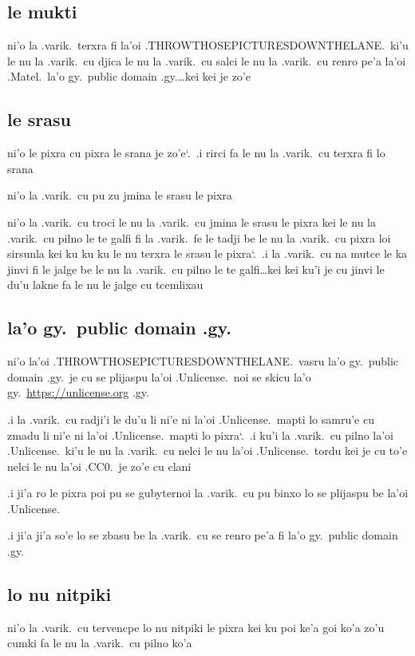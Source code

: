 \documentclass{report}
\newcommand\sds{\spacefactor\sfcode`.\ \space}
\begin{document}
\subsection{le mukti}
ni'o la .varik.\ terxra fi la'oi .THROWTHOSEPICTURESDOWNTHELANE.\ ki'u le nu la .varik.\ cu djica le nu la .varik.\ cu salci le nu la .varik.\ cu renro pe'a la'oi .Matel.\ la'o gy.\ public domain .gy.\ldots kei kei je zo'e

\subsection{le srasu}
ni'o le pixra cu pixra le srana je zo'e\sds  .i rirci fa le nu la .varik.\ cu terxra fi lo srana

ni'o la .varik.\ cu pu zu jmina le srasu le pixra

ni'o la .varik.\ cu troci le nu la .varik.\ cu jmina le srasu le pixra kei le nu la .varik.\ cu pilno le te galfi fi la .varik.\ fe le tadji be le nu la .varik.\ cu pixra loi sirsunla kei ku ku ku le nu terxra le srasu le pixra\sds  .i la .varik.\ cu na mutce le ka jinvi fi le jalge be le nu la .varik.\ cu pilno le te galfi\ldots kei kei ku'i je cu jinvi le du'u lakne fa le nu le jalge cu tcemlixau

\subsection{la'o gy.\ public domain .gy.}
ni'o la'oi .THROWTHOSEPICTURESDOWNTHELANE.\ vasru la'o gy.\ public domain .gy.\ je cu se plijaspu la'oi .Unlicense.\ noi se skicu la'o gy.\ \url{https://unlicense.org} .gy.

.i la .varik.\ cu radji'i le du'u li ni'e ni la'oi .Unlicense.\ mapti lo samru'e cu zmadu li ni'e ni la'oi .Unlicense.\ mapti lo pixra\sds  .i ku'i la .varik.\ cu pilno la'oi .Unlicense.\ ki'u le nu la .varik.\ cu nelci le nu la'oi .Unlicense.\ tordu kei je cu to'e nelci le nu la'oi .CC0.\ je zo'e cu clani

.i ji'a ro le pixra poi pu se gubyternoi la .varik.\ cu pu binxo lo se plijaspu be la'oi .Unlicense.

.i ji'a ji'a so'e lo se zbasu be la .varik.\ cu se renro pe'a fi la'o gy.\ public domain .gy.

\subsection{lo nu nitpiki}
ni'o la .varik.\ cu tervencpe lo nu nitpiki le pixra kei ku poi ke'a goi ko'a zo'u cumki fa le nu la .varik.\ cu pilno ko'a
\end{document}

